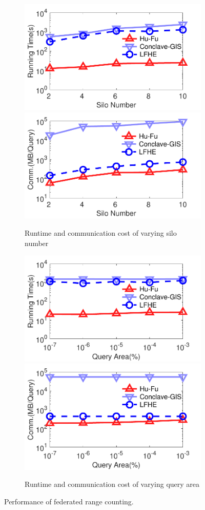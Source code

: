 \begin{figure}[t]
    \centering
    \begin{subfigure}{0.48\textwidth}
        \centering
        \includegraphics[width=0.48\linewidth]{traffic_rangecount_silo_time.pdf}
        \includegraphics[width=0.48\linewidth]{traffic_rangecount_silo_comm.pdf}
        \caption{Runtime and communication cost of varying silo number}
        \label{fig:symmetric-count-eff-silo-n}
    \end{subfigure}
    \begin{subfigure}{0.48\textwidth}
        \centering
        \includegraphics[width=0.48\linewidth]{traffic_rangecount_area_time.pdf}
        \includegraphics[width=0.48\linewidth]{traffic_rangecount_area_comm.pdf}
        \caption{Runtime and communication cost of varying query area}
        \label{fig:symmetric-count-eff-r-n}
    \end{subfigure}
    \caption{Performance of federated range counting.}
    \label{fig:symmetric-count-eff}
\end{figure}

